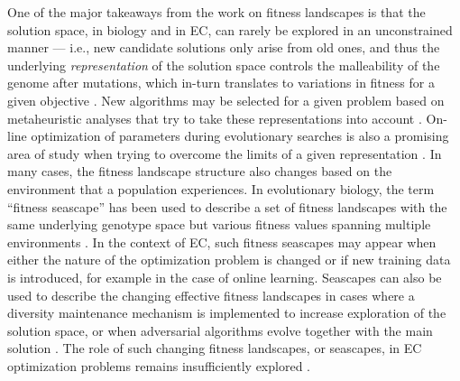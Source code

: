 One of the major takeaways from the work on fitness landscapes is that the solution space, in biology and in EC, can rarely be explored in an unconstrained manner --- i.e., new candidate solutions only arise from old ones, and thus the underlying \textit{representation} of the solution space controls the malleability of the genome after mutations, which in-turn translates to variations in fitness for a given objective \citep{ashlock2012representation}.
New algorithms may be selected for a given problem based on metaheuristic analyses that try to take these representations into account \citep{wang2018population}.
On-line optimization of parameters during evolutionary searches is also a promising area of study when trying to overcome the limits of a given representation \citep{dang2016selfadaptation}.
In many cases, the fitness landscape structure also changes based on the environment that a population experiences.
In evolutionary biology, the term ``fitness seascape'' has been used to describe a set of fitness landscapes with the same underlying genotype space but various fitness values spanning multiple environments \citep{mustonen2009fitness}.
In the context of EC, such fitness seascapes may appear when either the nature of the optimization problem is changed or if new training data is introduced, for example in the case of online learning.
Seascapes can also be used to describe the changing effective fitness landscapes in cases where a diversity maintenance mechanism is implemented to increase exploration of the solution space, or when adversarial algorithms evolve together with the main solution \citep{dolson2021digital}.
The role of such changing fitness landscapes, or seascapes, in EC optimization problems remains insufficiently explored \citep{grefenstette1999evolvability, richter2009detecting}.
